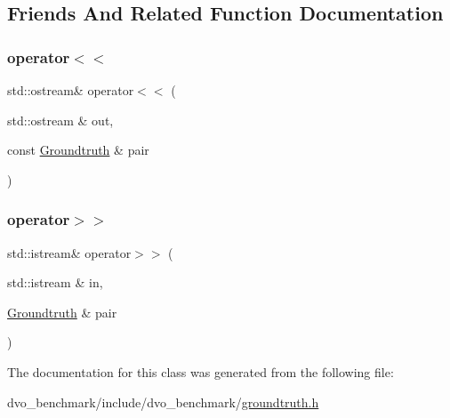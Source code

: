 \subsection{Friends And Related Function Documentation}
\mbox{\label{classdvo__benchmark_1_1_groundtruth_a253b88524b96be5898ba1b657cda2f9a}} 
\subsubsection{\texorpdfstring{operator$<$$<$}{operator<<}}
{\footnotesize\ttfamily std\+::ostream\& operator$<$$<$ (\begin{DoxyParamCaption}\item[{std\+::ostream \&}]{out,  }\item[{const \mbox{\hyperlink{classdvo__benchmark_1_1_groundtruth}{Groundtruth}} \&}]{pair }\end{DoxyParamCaption})\hspace{0.3cm}{\ttfamily [friend]}}

\mbox{\label{classdvo__benchmark_1_1_groundtruth_a2ce119ce35748a3d57ec0d36499c44e1}} 
\subsubsection{\texorpdfstring{operator$>$$>$}{operator>>}}
{\footnotesize\ttfamily std\+::istream\& operator$>$$>$ (\begin{DoxyParamCaption}\item[{std\+::istream \&}]{in,  }\item[{\mbox{\hyperlink{classdvo__benchmark_1_1_groundtruth}{Groundtruth}} \&}]{pair }\end{DoxyParamCaption})\hspace{0.3cm}{\ttfamily [friend]}}



The documentation for this class was generated from the following file\+:\begin{DoxyCompactItemize}
\item 
dvo\+\_\+benchmark/include/dvo\+\_\+benchmark/\mbox{\hyperlink{groundtruth_8h}{groundtruth.\+h}}\end{DoxyCompactItemize}
